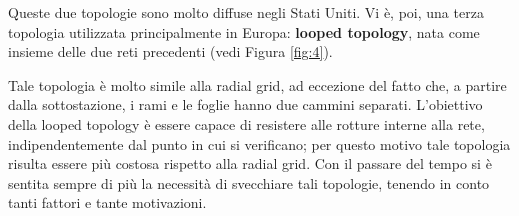 Queste due topologie sono molto diffuse negli Stati Uniti.
Vi è, poi, una terza topologia utilizzata principalmente in Europa: \textbf{looped topology}, nata come insieme delle due reti precedenti (vedi Figura \ref{fig:4}). 
\begin{figure}[h]
\end{figure}
Tale topologia è molto simile alla radial grid, ad eccezione del fatto che, a partire dalla sottostazione, i rami e le foglie hanno due cammini separati. L'obiettivo della looped topology è essere capace di resistere alle rotture interne alla rete, indipendentemente dal punto in cui si verificano; per questo motivo tale topologia risulta essere più costosa rispetto alla radial grid. Con il passare del tempo si è sentita sempre di più la necessità di svecchiare tali topologie, tenendo in conto tanti fattori e tante motivazioni.\newline
